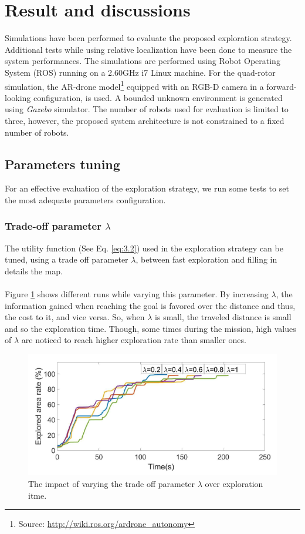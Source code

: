 \documentclass[11pt,openany]{book}
\begin{document}
\section{Result and discussions}
Simulations have been performed to evaluate the proposed exploration strategy. Additional tests while using relative localization have been done to measure the system performances. The simulations are performed using Robot Operating System (ROS) running on a 2.60GHz i7 Linux machine. For the quad-rotor simulation, the AR-drone model\footnote{Source: \url{http://wiki.ros.org/ardrone_autonomy}} equipped with an RGB-D camera in a forward-looking conﬁguration, is used. A bounded unknown environment is generated using \textit{Gazebo} simulator. The number of robots used for evaluation is limited to three, however, the proposed system architecture is not constrained to a ﬁxed number of robots.
\subsection{Parameters tuning}
For an eﬀective evaluation of the exploration strategy, we run some tests to set the most adequate parameters conﬁguration.
\subsubsection{Trade-off parameter $\lambda$}
The utility function (See Eq. \ref{eq:3.2}) used in the exploration strategy can be tuned, using a trade oﬀ parameter $\lambda$, between fast exploration and ﬁlling in details the map.\\\\
Figure \ref{fig:3.11} shows diﬀerent runs while varying this parameter. By increasing $\lambda$, the information gained when reaching the goal is favored over the distance and thus, the cost to it, and vice versa. So, when $\lambda$ is small, the traveled distance is small and so the exploration time. Though, some times during the mission, high values of $\lambda$ are noticed to reach higher exploration rate than smaller ones.
\begin{figure}[H]
    \centering
    \includegraphics[scale=0.5]{assets/3_11.png}
    \caption{The impact of varying the trade off parameter $\lambda$ over exploration itme.}
    \label{fig:3.11}
\end{figure}
\end{document}
